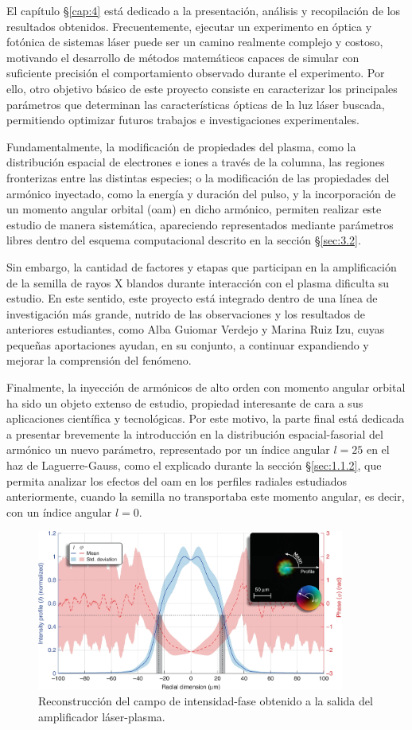 El capítulo \S\ref{cap:4} está dedicado a la presentación, análisis y recopilación de los resultados obtenidos. Frecuentemente, ejecutar un experimento en óptica y fotónica de sistemas láser puede ser un camino realmente complejo y costoso, motivando el desarrollo de métodos matemáticos capaces de simular con suficiente precisión el comportamiento observado durante el experimento. Por ello, otro objetivo básico de este proyecto consiste en caracterizar los principales parámetros que determinan las características ópticas de la luz láser buscada, permitiendo optimizar futuros trabajos e investigaciones experimentales.

Fundamentalmente, la modificación de propiedades del plasma, como la distribución espacial de electrones e iones a través de la columna, las regiones fronterizas entre las distintas especies; o la modificación de las propiedades del armónico inyectado, como la energía y duración del pulso, y la incorporación de un momento angular orbital (\acrshort{oam}) en dicho armónico, permiten realizar este estudio de manera sistemática, apareciendo representados mediante parámetros libres dentro del esquema computacional descrito en la sección \S\ref{sec:3.2}.

Sin embargo, la cantidad de factores y etapas que participan en la amplificación de la semilla de rayos X blandos durante interacción con el plasma dificulta su estudio. En este sentido, este proyecto está integrado dentro de una línea de investigación más grande, nutrido de las observaciones y los resultados de anteriores estudiantes, como Alba Guiomar Verdejo y Marina Ruiz Izu, cuyas pequeñas aportaciones ayudan, en su conjunto, a continuar expandiendo y mejorar la comprensión del fenómeno.

Finalmente, la inyección de armónicos de alto orden con momento angular orbital ha sido un objeto extenso de estudio, propiedad interesante de cara a sus aplicaciones científica y tecnológicas. Por este motivo, la parte final está dedicada a presentar brevemente la introducción en la distribución espacial-fasorial del armónico un nuevo parámetro, representado por un índice angular $l=25$ en el haz de Laguerre-Gauss, como el explicado durante la sección \S\ref{sec:1.1.2}, que permita analizar los efectos del \acrshort{oam} en los perfiles radiales estudiados anteriormente, cuando la semilla no transportaba este momento angular, es decir, con un índice angular $l=0$.

\begin{figure}[htbp]
  \centering
  \includegraphics[width=0.9\textwidth]{Figuras/ch2_curvas_lab.png}
  \caption{Reconstrucción del campo de intensidad-fase obtenido a la salida del amplificador láser-plasma. \autocite{Tuitje2020}}
  \label{fig:2.2}
\end{figure}



